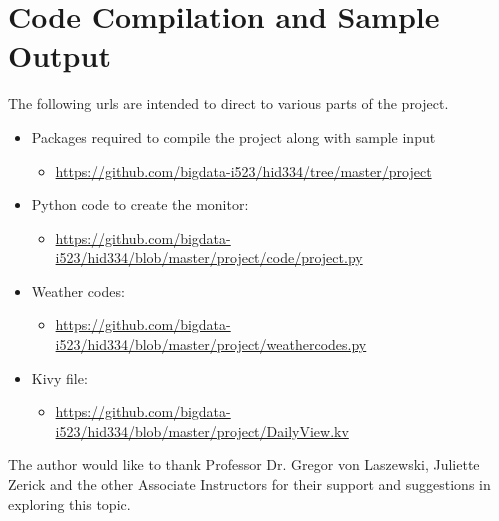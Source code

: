 \documentclass[sigconf]{acmart}
\begin{document}
\appendix

\section{Code Compilation and Sample Output}
The following urls are intended to direct to various parts of the project. 
\begin{itemize}
    \item Packages required to compile the project along with sample input
        \begin{itemize}
            \item \url{https://github.com/bigdata-i523/hid334/tree/master/project}
        \end{itemize}
    \item Python code to create the monitor: 
        \begin{itemize}
            \item \url{https://github.com/bigdata-i523/hid334/blob/master/project/code/project.py}
        \end{itemize}
    \item Weather codes: 
        \begin{itemize}
            \item \url{https://github.com/bigdata-i523/hid334/blob/master/project/weathercodes.py}
        \end{itemize}
    \item Kivy file: 
        \begin{itemize}
            \item \url{https://github.com/bigdata-i523/hid334/blob/master/project/DailyView.kv}
        \end{itemize}
    
    
\end{itemize}




 
 
 
\begin{acks}
The author would like to thank Professor Dr. Gregor von Laszewski, Juliette Zerick and the other Associate Instructors for their support and suggestions in exploring this topic.
\end{acks}


 

%
\end{document}
